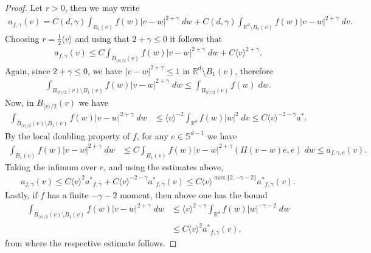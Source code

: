 \documentclass[12pt,american]{amsart}
\numberwithin{equation}{section}
\theoremstyle{plain}
\theoremstyle{definition}                  %
\def\astar{{a^*}}
\begin{document}
\begin{proof}
  Let $r>0$, then we may write
  \begin{align*}
    a_{f,\gamma}(v) = C(d,\gamma)\int_{B_r(v)}f(w)|v-w|^{2+\gamma}\;dw+C(d,\gamma)\int_{\mathbb{R}^d\setminus B_r(v)}f(w)|v-w|^{2+\gamma}\;dv. 
  \end{align*}
  Choosing $r = \frac{1}{2}\langle v\rangle$ and using that $2+\gamma\leq 0$ it follows that
  \begin{align*}
    a_{f,\gamma}(v) \leq C\int_{B_{\langle v\rangle/2}(v)}f(w)|v-w|^{2+\gamma}\;dw+C\langle v\rangle^{2+\gamma}.
  \end{align*}
  Again, since $2+\gamma\leq 0$, we have $|v-w|^{2+\gamma}\leq 1$ in $\mathbb{R}^d\setminus B_1(v)$, therefore
  \begin{align*}
    \int_{B_{\langle v\rangle/2}(v) \setminus B_1(v)}f(w)|v-w|^{2+\gamma}\;dw \leq \int_{B_{\langle v\rangle/2}(v)}f(w)\;dw . 
  \end{align*}
  Now, in $B_{\langle v\rangle/2}(v)$ we have 
  \begin{align*}
    \int_{B_{\langle v\rangle/2}(v) \setminus B_1(v)}f(w)|v-w|^{2+\gamma}\;dw & \leq \langle v\rangle^{-2}\int_{\mathbb{R}^d}f(w)|w|^{2}\;dv \leq C\langle v\rangle^{-2-\gamma}\astar. 
  \end{align*}
  By the local doubling property of $f$, for any $e\in\mathbb{S}^{d-1}$ we have 
  \begin{align*}
    \int_{B_1(v)}f(w)|v-w|^{2+\gamma}\;dw & \leq C\int_{B_1(v)}f(w)|v-w|^{2+\gamma}(\Pi(v-w)e,e)\;dw \leq a_{f,\gamma,e}(v).	
  \end{align*}	  
  Taking the infimum over $e$, and using the estimates above, 
  \begin{align*}
    a_{f,\gamma}(v) \leq C\langle v\rangle^2 \astar_{f,\gamma}+C\langle v\rangle^{-2-\gamma}\astar_{f,\gamma}(v) \leq C\langle v\rangle^{\max\{2,-\gamma-2\} }\astar_{f,\gamma}(v).	  
  \end{align*}	  
  Lastly, if $f$ has a finite $-\gamma-2$ moment, then above one has the bound
  \begin{align*}
    \int_{B_{\langle v\rangle/2}(v) \setminus B_1(v)}f(w)|v-w|^{2+\gamma}\;dw & \leq \langle v\rangle^{2-\gamma}\int_{\mathbb{R}^d}f(w)|w|^{-\gamma-2}\;dw \\
	  & \leq C\langle v\rangle^2 \astar_{f,\gamma}(v),
  \end{align*}
  from where the respective estimate follows.
\end{proof}
\end{document}
